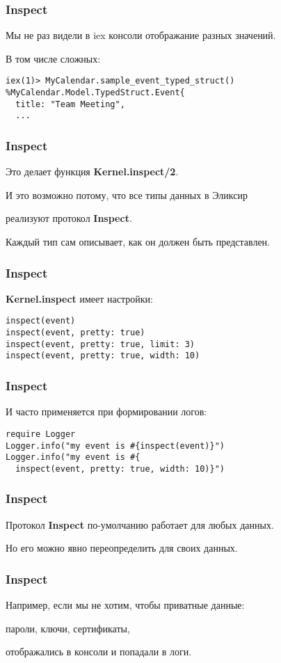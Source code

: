 \documentclass[10pt]{beamer}
\begin{document}
\begin{frame}[fragile]
  \frametitle{Inspect}
  Мы не раз видели в iex консоли отображание разных значений.
  \par \bigskip
  В том числе сложных:
  \par \bigskip
  \begin{lstlisting}
iex(1)> MyCalendar.sample_event_typed_struct()
%MyCalendar.Model.TypedStruct.Event{
  title: "Team Meeting",
  ...
  \end{lstlisting}
\end{frame}

\begin{frame}
  \frametitle{Inspect}
  Это делает функция \textbf{Kernel.inspect/2}.
  \par \bigskip
  И это возможно потому, что все типы данных в Эликсир
  \par \bigskip
  реализуют протокол \textbf{Inspect}.
  \par \bigskip
  Каждый тип сам описывает, как он должен быть представлен.
\end{frame}

\begin{frame}[fragile]
  \frametitle{Inspect}
  \textbf{Kernel.inspect} имеет настройки:
  \par \bigskip
  \begin{lstlisting}
inspect(event)
inspect(event, pretty: true)
inspect(event, pretty: true, limit: 3)
inspect(event, pretty: true, width: 10)
  \end{lstlisting}
\end{frame}

\begin{frame}[fragile]
  \frametitle{Inspect}
  И часто применяется при формировании логов:
  \par \bigskip
  \begin{lstlisting}
require Logger
Logger.info("my event is #{inspect(event)}")
Logger.info("my event is #{
  inspect(event, pretty: true, width: 10)}")
  \end{lstlisting}
\end{frame}

\begin{frame}
  \frametitle{Inspect}
  Протокол \textbf{Inspect} по-умолчанию работает для любых данных.
  \par \bigskip
  Но его можно явно переопределить для своих данных.
\end{frame}

\begin{frame}
  \frametitle{Inspect}
  Например, если мы не хотим, чтобы приватные данные:
  \par \bigskip
  пароли, ключи, сертификаты,
  \par \bigskip
  отображались в консоли и попадали в логи.
\end{frame}
\end{document}
